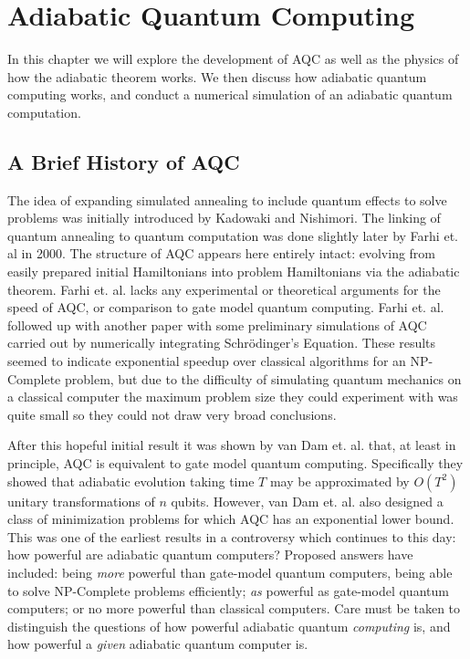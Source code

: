 \chapter{Adiabatic Quantum Computing}
\label{chap:aqc}

In this chapter we will explore the development of AQC as well as the physics of how the adiabatic theorem works.  We then discuss how adiabatic quantum computing works, and conduct a numerical simulation of an adiabatic quantum computation.

\section{A Brief History of AQC}
The idea of expanding simulated annealing to include quantum effects to solve problems was initially introduced by Kadowaki and Nishimori.\cite{transverse}  The linking of quantum annealing to quantum computation was done slightly later by Farhi et. al in 2000.\cite{farhi}  The structure of AQC appears here entirely intact: evolving from easily prepared initial Hamiltonians into problem Hamiltonians via the adiabatic theorem.  Farhi et. al.\cite{farhi} lacks any experimental or theoretical arguments for the speed of AQC, or comparison to gate model quantum computing.  Farhi et. al. followed up with another paper\cite{farhi2} with some preliminary simulations of AQC carried out by numerically integrating Schr\"odinger's Equation.  These results seemed to indicate exponential speedup over classical algorithms for an NP-Complete problem, but due to the difficulty of simulating quantum mechanics on a classical computer the maximum problem size they could experiment with was quite small so they could not draw very broad conclusions.

After this hopeful initial result it was shown by van Dam et. al.\cite{vandam} that, at least in principle, AQC is equivalent to gate model quantum computing.  Specifically they showed that adiabatic evolution taking time $T$ may be approximated by $O(T^2)$ unitary transformations of $n$ qubits.  However, van Dam et. al. also designed a class of minimization problems for which AQC has an exponential lower bound.  This was one of the earliest results in a controversy which continues to this day: how powerful are adiabatic quantum computers?  Proposed answers have included: being \emph{more} powerful than gate-model quantum computers, being able to solve NP-Complete problems efficiently;\cite{geordie}\cite{google} \emph{as} powerful as gate-model quantum computers;\cite{vandam} or no more powerful than classical computers.\cite{}  Care must be taken to distinguish the questions of how powerful adiabatic quantum \emph{computing} is, and how powerful a \emph{given} adiabatic quantum computer is.

